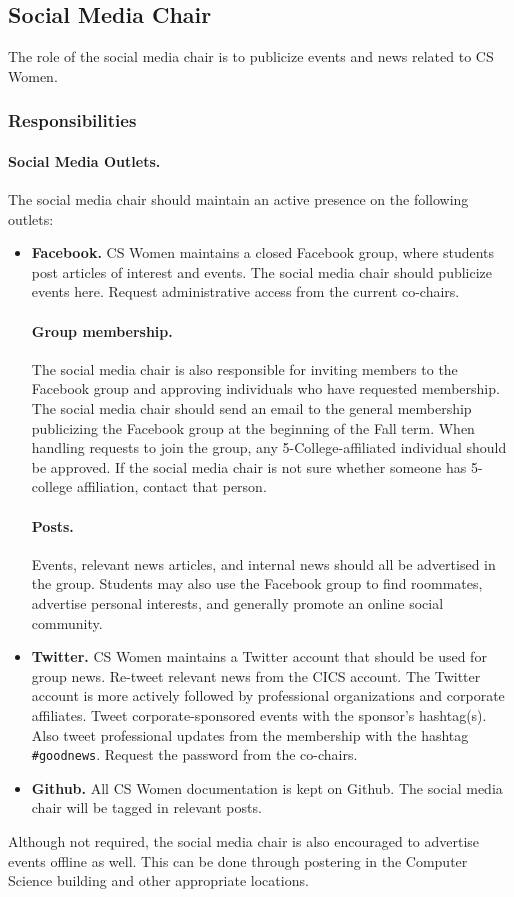 \subsection{Social Media Chair}
\label{sec:socialmedia}
The role of the social media chair is to publicize events and news related to CS Women. 

\subsubsection{Responsibilities}
\label{sec:socialmedia_responsibilities}
\paragraph{Social Media Outlets.} The social media chair should maintain an active presence on the following outlets:
\begin{itemize}
	\item \textbf{Facebook.} CS Women maintains a closed Facebook group, where students post articles of interest and events. The social media chair should publicize events here. Request administrative access from the current co-chairs.
		\paragraph{Group membership.} The social media chair is also responsible for inviting members to the Facebook group and approving individuals who have requested membership. The social media chair should send an email to the general membership publicizing the Facebook group at the beginning of the Fall term. When handling requests to join the group, any 5-College-affiliated individual should be approved. If the social media chair is not sure whether someone has 5-college affiliation, contact that person. 
		\paragraph{Posts.} Events, relevant news articles, and internal news should all be advertised in the group. Students may also use the Facebook group to find roommates, advertise personal interests, and generally promote an online social community.
	\item \textbf{Twitter.} CS Women maintains a Twitter account that should be used for group news. Re-tweet relevant news from the CICS account. The Twitter account is more actively followed by professional organizations and corporate affiliates. Tweet corporate-sponsored events with the sponsor's hashtag(s). Also tweet professional updates from the membership with the hashtag \verb|#goodnews|. Request the password from the co-chairs.
	\item \textbf{Github.} All CS Women documentation is kept on Github. The social media chair will be tagged in relevant posts.
\end{itemize}
Although not required, the social media chair is also encouraged to advertise events offline as well. This can be done through postering in the Computer Science building and other appropriate locations.

